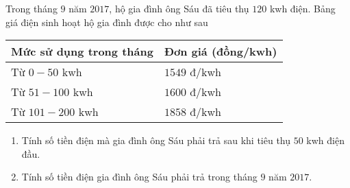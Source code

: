 \begin{bt}%
	Trong tháng $ 9 $ năm $ 2017 $, hộ gia đình ông Sáu đã tiêu thụ $ 120 $ kwh điện. Bảng giá điện sinh hoạt hộ gia đình được cho như sau
	\begin{center}
		 \begin{tabular}{|>{\centering}p{6cm}|p{6cm}<{\centering}|}\hline
			\textbf{Mức sử dụng trong tháng}&\textbf{Đơn giá (đồng/kwh)} \\ \hline
			Từ $ 0-50 $ kwh&$ 1549 $ đ/kwh\\ \hline
			Từ $ 51-100 $ kwh&$ 1600 $ đ/kwh\\ \hline
			Từ $ 101-200 $ kwh&$ 1858 $ đ/kwh\\ \hline
		\end{tabular}
	\end{center}
\begin{enumerate}
	\item Tính số tiền điện mà gia đình ông Sáu phải trả sau khi tiêu thụ $ 50 $ kwh điện đầu.
	\item Tính số tiền điện gia đình ông Sáu phải trả trong tháng $ 9 $ năm $ 2017 $.
\end{enumerate}
\end{bt}
